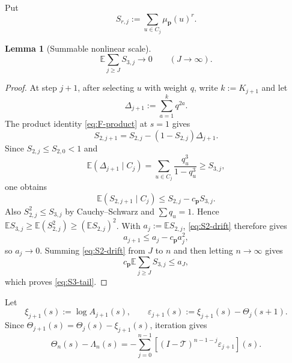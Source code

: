 \documentclass[journal]{IEEEtran}
\theoremstyle{plain}
\newtheorem{lemma}[theorem]{Lemma}
\theoremstyle{definition}
\theoremstyle{remark}
\newcommand{\muP}{\mu_{\mathbf p}}
\begin{document}
Put
\begin{equation}\label{eq:S-r}
 S_{r,j}:=\sum_{u\in C_j}\muP(u)^r.
\end{equation}

\begin{lemma}[Summable nonlinear scale]\label{lem:S3}
\begin{equation}\label{eq:S3-tail}
 \mathbb E\sum_{j\ge J}S_{3,j}\longrightarrow0
 \qquad(J\to\infty).
\end{equation}
\end{lemma}

\begin{proof}
At step $j+1$, after selecting $u$ with weight $q$, write $k:=K_{j+1}$ and let
\begin{equation*}
 \Delta_{j+1}:=\sum_{a=1}^{k}q^{2a}.
\end{equation*}
The product identity \eqref{eq:F-product} at $s=1$ gives
\begin{equation*}
 S_{2,j+1}=S_{2,j}-(1-S_{2,j})\Delta_{j+1}.
\end{equation*}
Since $S_{2,j}\le S_{2,0}<1$ and
\begin{equation*}
 \mathbb E(\Delta_{j+1}\mid C_j)
 =\sum_{u\in C_j}\frac{q_u^3}{1-q_u^3}\ge S_{3,j},
\end{equation*}
one obtains
\begin{equation}\label{eq:S2-drift}
 \mathbb E(S_{2,j+1}\mid C_j)
 \le S_{2,j}-c_{\mathbf p}S_{3,j}.
\end{equation}
Also $S_{2,j}^2\le S_{3,j}$ by Cauchy--Schwarz and $\sum q_u=1$.  Hence
$\mathbb E S_{3,j}\ge\mathbb E(S_{2,j}^2)\ge(\mathbb E S_{2,j})^2$.  With $a_j:=\mathbb E S_{2,j}$, \eqref{eq:S2-drift} therefore gives
\begin{equation*}
 a_{j+1}\le a_j-c_{\mathbf p}a_j^2,
\end{equation*}
so $a_j\to0$.  Summing \eqref{eq:S2-drift} from $J$ to $n$ and then letting $n\to\infty$ gives
\begin{equation*}
 c_{\mathbf p}\mathbb E\sum_{j\ge J}S_{3,j}
 \le a_J,
\end{equation*}
which proves \eqref{eq:S3-tail}.
\end{proof}

Let
\begin{equation*}
 \xi_{j+1}(s):=\log A_{j+1}(s),
 \qquad
 \varepsilon_{j+1}(s):=\xi_{j+1}(s)-\Theta_j(s+1).
\end{equation*}
Since $\Theta_{j+1}(s)=\Theta_j(s)-\xi_{j+1}(s)$, iteration gives
\begin{equation}\label{eq:rest-decomposition-new}
 \Theta_n(s)-\Lambda_n(s)
 =-\sum_{j=0}^{n-1}[(I-\mathcal T)^{n-1-j}\varepsilon_{j+1}](s).
\end{equation}
\end{document}

